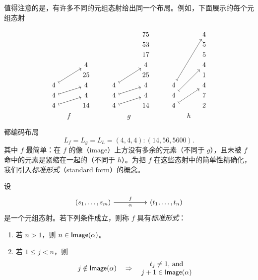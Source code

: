 \begin{remark}\label{standardformmotivation} 值得注意的是，有许多不同的元组态射给出同一个布局。例如，下面展示的每个元组态射

\[
\begin{tikzcd}[row sep=1, column sep=8]
  & &    & & &   & & 75 & & &   & & 4\\
  & &    & & &   & & 53 & & &   & & 5\\
  & &    & & &   & & 17 & & &   & & 5\\
  & &  4 & & &   & & 4  & & &   & & 4\\
  & & 25 & & &   & & 25 & & &   & & 1\\
4 \ar[uurr,mapsto] & & 4 & & & 4 \ar[uurr,mapsto] & & 4 & & & 4 \ar[uuuuurr,mapsto] & & 4\\
4 \ar[urr,mapsto] & & 4 & & & 4 \ar[urr,mapsto] & & 4 & & & 4 \ar[uuurr, mapsto] & & 7\\
4 \ar[urr,mapsto] & &14 & & & 4 \ar[urr,mapsto] & &14 & & & 4 \ar[uurr,mapsto] & & 2\\
  &f & & & & & g & & & & & h & \\
\end{tikzcd}
\]
都编码布局
\[
L_{f} = L_{g} = L_{h} = (4,4,4):(14,56,5600).
\]
\noindent 其中 $f$ 最简单：在 $f$ 的像（image）上方没有多余的元素（不同于 $g$），且未被 $f$ 命中的元素是紧缩在一起的（不同于 $h$）。为把 $f$ 在这些态射中的简单性精确化，我们引入{\it 标准形式}（standard form）的概念。
\end{remark}

\begin{definition}\label{definitionofstandardform}
    设
    \[ \begin{tikzcd}
    (s_1,\dots,s_m) \ar[rr,swap,"\alpha"] \ar[rr,"f"] & & (t_1,\dots,t_n)
    \end{tikzcd} \]
    是一个元组态射。若下列条件成立，则称 $f$ 具有{\it 标准形式}：
    \begin{enumerate}
        \item 若 $n > 1$，则 $n \in \mathsf{Image}(\alpha)$。
        \item 若 $1 \leq j < n$，则
        \[
         j \notin \mathsf{Image}(\alpha) \quad \Rightarrow \quad \begin{matrix} t_j \neq 1\text{, and}\\
        j+1 \in \mathsf{Image}(\alpha)
         \end{matrix}
        \]
    \end{enumerate}
\end{definition}

